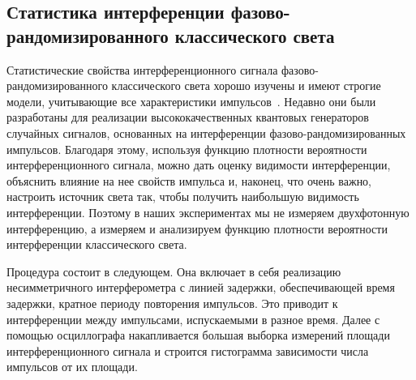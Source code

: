 
\subsection{Статистика интерференции фазово-рандомизированного классического света}

Статистические свойства интерференционного сигнала фазово-рандомизированного классического света хорошо изучены и имеют строгие модели, учитывающие все характеристики импульсов~\cite{shakhovoy2020, shakhovoy2021}. Недавно они были разработаны для реализации высококачественных квантовых генераторов случайных сигналов, основанных на интерференции фазово-рандомизированных импульсов. Благодаря этому, используя функцию плотности вероятности интерференционного сигнала, можно дать оценку видимости интерференции, объяснить влияние на нее свойств импульса и, наконец, что очень важно, настроить источник света так, чтобы получить наибольшую видимость интерференции. Поэтому в наших экспериментах мы не измеряем двухфотонную интерференцию, а измеряем и анализируем функцию плотности вероятности интерференции классического света.   

Процедура состоит в следующем. Она включает в себя реализацию несимметричного интерферометра с линией задержки, обеспечивающей время задержки, кратное периоду повторения импульсов. Это приводит к интерференции между импульсами, испускаемыми в разное время. Далее с помощью осциллографа накапливается большая выборка измерений площади интерференционного сигнала и строится гистограмма зависимости числа импульсов от их площади.

